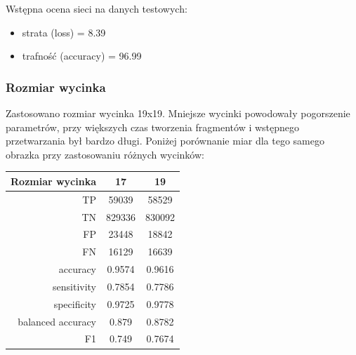 \documentclass[polish,polish,a4paper]{article}
\begin{document}
Wstępna ocena sieci na danych testowych:
\begin{itemize}
    \item strata (loss) = 8.39%
    \item trafność (accuracy) = 96.99%
\end{itemize}

\subsubsection*{Rozmiar wycinka}
Zastosowano rozmiar wycinka 19x19. Mniejsze wycinki powodowały pogorszenie parametrów, przy większych czas tworzenia fragmentów i wstępnego przetwarzania był bardzo długi. Poniżej porównanie miar dla tego samego obrazka przy zastosowaniu różnych wycinków:

\begin{center}
\begin{tabular}{|r|c|c|}
\hline
\textbf{Rozmiar wycinka} & \textbf{17} & \textbf{19}  \\ \hline \hline
TP                & 59039                                         & 58529                                         \\ \hline
TN                & 829336                                        & 830092                                        \\ \hline
FP                & 23448                                         & 18842                                         \\ \hline
FN                & 16129                                         & 16639                                         \\ \hline
accuracy          & 0.9574                                        & 0.9616                                        \\ \hline
sensitivity       & 0.7854                                        & 0.7786                                        \\ \hline
specificity       & 0.9725                                        & 0.9778                                        \\ \hline
balanced accuracy & 0.879                                         & 0.8782                                        \\ \hline
F1                & 0.749                                         & 0.7674                                        \\ \hline

\end{tabular}
\end{center}
\end{document}
